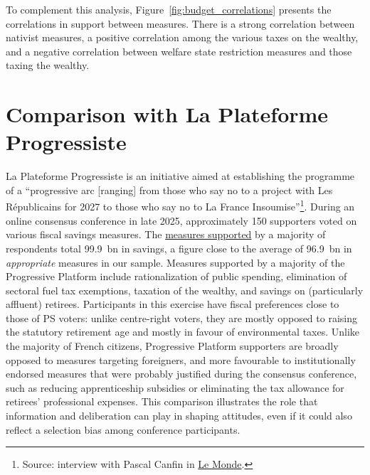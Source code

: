 \documentclass[12pt,english]{article}
\newcommand{\blue}[1]{\textcolor{blue!60!black}{#1}}
\begin{document}
To complement this analysis, Figure~\ref{fig:budget_correlations} presents the correlations in support between measures. There is a strong correlation between nativist measures,
a positive correlation among the various taxes on the wealthy, and a negative correlation between welfare state restriction measures and those taxing the wealthy.


\section{Comparison with La Plateforme Progressiste}
\label{sec:progressistes}

\blue{La Plateforme Progressiste is an initiative aimed at establishing the programme of a ``progressive arc [ranging] from those who say no to a project with Les Républicains for 2027 to those who say no to La France Insoumise''}\footnote{Source: interview with Pascal Canfin in \href{https://www.lemonde.fr/politique/article/2025/07/01/pascal-canfin-personne-parmi-les-progressistes-ne-pourra-gagner-seul-l-election-presidentielle_6617180_823448.html}{Le Monde}.}. During an online consensus conference in late 2025, approximately 150 supporters voted on various fiscal savings measures. The \href{https://laplateformeprogressiste.org/wp-content/uploads/2025/12/20251210_Resultats-par-mesure-1.pdf}{measures supported} by a majority of respondents total 99.9~bn in savings, a figure close to the average of 96.9~bn in \textit{appropriate} measures in our sample. Measures supported by a majority of the Progressive Platform include rationalization of public spending, elimination of sectoral fuel tax exemptions, taxation of the wealthy, and savings on (particularly affluent) retirees. \blue{Participants in this exercise have fiscal preferences close to those of PS voters}: unlike centre-right voters, they are mostly opposed to raising the statutory retirement age and mostly in favour of environmental taxes. Unlike the majority of French citizens, Progressive Platform supporters are broadly opposed to measures targeting foreigners, and more favourable to institutionally endorsed measures that were probably justified during the consensus conference, such as reducing apprenticeship subsidies or eliminating the tax allowance for retirees' professional expenses.
This comparison illustrates the role that information and deliberation can play in shaping attitudes, even if it could also reflect a selection bias among conference participants.
\end{document}
